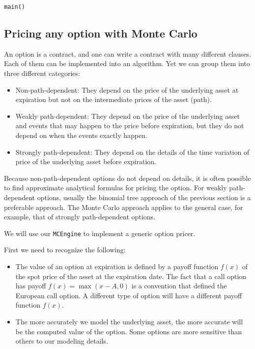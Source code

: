 \documentclass[justified, sixbynine]{tufte-book}
\def\ft{\small\tt}
\theoremstyle{plain}%
\newtheorem * {corollary}{Corollary}
\theoremstyle{definition}
\theoremstyle{remark}
\newtheorem * {remark}{Remark}
\newtheorem * {note}{Note}
\begin{document}
\begin{fullwidth}
\begin{lstlisting}[caption={in file: {\ft options.nim}}]
main()
\end{lstlisting}

\goodbreak\subsection{Pricing any option with Monte Carlo}

An option is a contract, and one can write a contract with many different clauses. Each of them can be implemented into an algorithm. Yet we can group them into three different categories:
\begin{itemize}
\item Non-path-dependent: They depend on the price of the underlying asset at expiration but not on the intermediate prices of the asset (path).
\item Weakly path-dependent: They depend on the price of the underlying asset and events that may happen to the price before expiration, but they do not depend on when the events exactly happen.
\item Strongly path-dependent: They depend on the details of the time variation of price of the underlying asset before expiration.
\end{itemize}

 Because non-path-dependent options do not depend on details, it is often possible to find approximate analytical formulas for pricing the option. For weakly path-dependent options, usually the binomial tree approach of the previous section is a preferable approach. The Monte Carlo approach applies to the general case, for example, that of strongly path-dependent options.

We will use our {\ft MCEngine} to implement a generic option pricer.

First we need to recognize the following:

\begin{itemize}
\item  The value of an option at expiration is defined by a payoff function
$f(x)$ of the spot price of the asset at the expiration date. The fact that
a call option has payoff $f(x)=\max (x-A, 0)$ is a convention that defined the European call option.
A different type of option will have a different payoff function $f(x)$.

\item  The more accurately we model the underlying asset, the more accurate will be the computed value of the option. Some options are more sensitive than others to our modeling details.
\end{itemize}


\end{fullwidth}
\end{document}
